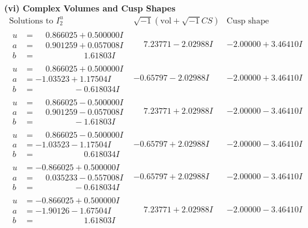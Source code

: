 \documentclass[1p]{elsarticle_modified}
\theoremstyle{definition}
\newcommand{\I}{\sqrt{-1}}
\begin{document}
\newpage\flushleft \textbf{(vi) Complex Volumes and Cusp Shapes}
$$\begin{array}{c|c|c}  
\text{Solutions to }I^u_{2}& \I (\text{vol} + \sqrt{-1}CS) & \text{Cusp shape}\\
 \hline 
\begin{aligned}
u &= \phantom{-}0.866025 + 0.500000 I \\
a &= \phantom{-}0.901259 + 0.057008 I \\
b &= \phantom{-0.000000 -}1.61803 I\end{aligned}
 & \phantom{-}7.23771 - 2.02988 I & -2.00000 + 3.46410 I \\ \hline\begin{aligned}
u &= \phantom{-}0.866025 + 0.500000 I \\
a &= -1.03523 + 1.17504 I \\
b &= \phantom{-0.000000 } -0.618034 I\end{aligned}
 & -0.65797 - 2.02988 I & -2.00000 + 3.46410 I \\ \hline\begin{aligned}
u &= \phantom{-}0.866025 - 0.500000 I \\
a &= \phantom{-}0.901259 - 0.057008 I \\
b &= \phantom{-0.000000 } -1.61803 I\end{aligned}
 & \phantom{-}7.23771 + 2.02988 I & -2.00000 - 3.46410 I \\ \hline\begin{aligned}
u &= \phantom{-}0.866025 - 0.500000 I \\
a &= -1.03523 - 1.17504 I \\
b &= \phantom{-0.000000 -}0.618034 I\end{aligned}
 & -0.65797 + 2.02988 I & -2.00000 - 3.46410 I \\ \hline\begin{aligned}
u &= -0.866025 + 0.500000 I \\
a &= \phantom{-}0.035233 - 0.557008 I \\
b &= \phantom{-0.000000 } -0.618034 I\end{aligned}
 & -0.65797 + 2.02988 I & -2.00000 - 3.46410 I \\ \hline\begin{aligned}
u &= -0.866025 + 0.500000 I \\
a &= -1.90126 - 1.67504 I \\
b &= \phantom{-0.000000 -}1.61803 I\end{aligned}
 & \phantom{-}7.23771 + 2.02988 I & -2.00000 - 3.46410 I \\ \hline\begin{aligned}

\end{aligned}
\end{array}$$
\end{document}
